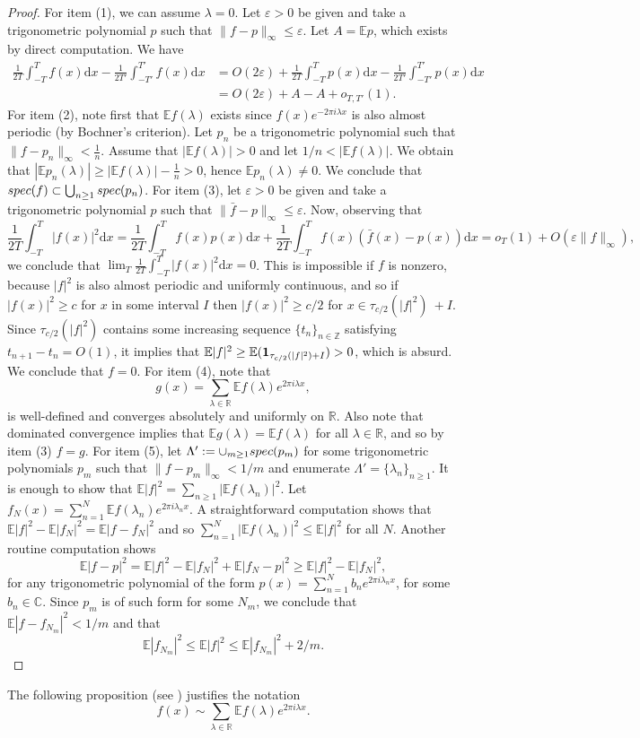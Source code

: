 \documentclass[a4paper,reqno,12pt]{amsart}
\newcommand{\E}{\mathcal{E}}
\newcommand{\z}{\mathbb{Z}}
\renewcommand{\r}{\mathbb{R}}
\newcommand{\cp}{\mathbb{C}} %
\newcommand{\la}{\lambda}
\newcommand{\ep}{\varepsilon}
\renewcommand{\d}{\mathrm{d}}
\newcommand{\1}{{\bf 1}}
\renewcommand{\E}{\mathbb{E}}
\renewcommand{\1}{{\bo 1}}
\newcommand{\spec}{{\rm spec}}
\begin{document}
\begin{proof}
For item (1), we can assume $\la=0$. Let $\ep>0$ be given and take a trigonometric polynomial $p$ such that $\|f-p\|_\infty\leq \ep$. Let $A=\E p$, which exists by direct computation. We have
\begin{align*}
\frac{1}{2T}\int_{-T}^T f(x)\d x - \frac{1}{2T'}\int_{-T'}^{T'} f(x)\d x & = O(2\ep) + \frac{1}{2T}\int_{-T}^T p(x)\d x - \frac{1}{2T'}\int_{-T'}^{T'} p(x)\d x \\ & = O(2\ep)  + A - A + o_{T,T'}(1).
\end{align*}
For item (2), note first that $\E f(\la)$ exists since $f(x)e^{-2\pi i \la x}$ is also almost periodic (by Bochner's criterion). Let $p_n$ be a trigonometric polynomial such that
$
\|f-p_n\|_\infty < \frac{1}{n}.
$
Assume that $|\E f(\la)|>0$ and let $1/n<|\E f(\la)|$. We obtain that
$|\E p_n(\la)| \geq |\E f(\la)|-\frac{1}{n} > 0$, hence $\E p_n(\la)\neq 0$. 
We conclude that $\spec(f) \subset \bigcup_{n\geq 1} \spec(p_n)$.
For item (3), let $\ep>0$ be given and take a trigonometric polynomial $p$ such that $\|\bar f-p\|_\infty\leq \ep$. Now, observing that
$$
\frac{1}{2T}\int_{-T}^T |f(x)|^2\d x = \frac{1}{2T}\int_{-T}^T f(x)p(x)\d x + \frac{1}{2T}\int_{-T}^T f(x)(\bar f(x)-p(x))\d x = o_T(1) + O(\ep\|f\|_\infty),
$$
we conclude that $\lim_T \frac{1}{2T}\int_{-T}^T |f(x)|^2\d x=0$. This is impossible if $f$ is nonzero, because $|f|^2$ is also almost periodic and uniformly continuous, and so if $|f(x)|^2 \geq c$ for $x$ in some interval $I$ then $|f(x)|^2 \geq c/2$ for $x\in \tau_{c/2}(|f|^2)\
 + I$. Since $\tau_{c/2}(|f|^2)$ contains some increasing sequence $\{t_n\}_{n\in \z}$ satisfying $t_{n+1}-t_n =O(1)$, it implies that $\E |f|^2 \geq \E ({\bf 1}_{\tau_{c/2}(|f|^2) + I})>0$, which is absurd. We conclude that $f=0$.
For item (4), note that 
$$
g(x)=\sum_{\la\in \r} \E f(\la)e^{2\pi i \la x},
$$
is well-defined and converges absolutely and uniformly on $\r$. Also note that dominated convergence implies that $\E g(\la)=\E f(\la)$ for all $\la\in \r$, and so by item (3) $f=g$.
For item (5), let $ \Lambda':=\cup_{m\geq 1} \spec(p_m)$ for some trigonometric polynomials $p_m$ such that $\|f-p_m\|_\infty<1/m$ and enumerate $\Lambda'=\{\la_n\}_{n\geq 1}$. It is enough to show that $\E |f|^2 = \sum_{n\geq 1} |\E f(\la_n)|^2$. Let $f_N(x) = \sum_{n=1}^N \E f(\la_n) e^{2\pi i \la_n x}$. A straightforward computation shows that $\E |f|^2 - \E |f_N|^2 = \E |f-f_N|^2$ and so $\sum_{n=1}^N |\E f(\la_n)|^2 \leq \E |f|^2$ for all $N$. Another routine computation shows
$$
\E |f-p|^2 = \E |f|^2 - \E |f_N|^2 + \E |f_N-p|^2 \geq \E |f|^2 - \E |f_N|^2,
$$
for any trigonometric polynomial of the form $p(x)=\sum_{n=1}^N b_n e^{2\pi i \la_n x}$, for some $b_n\in \cp$. Since $p_m$ is of such form for some $N_m$, we conclude that $\E |f-f_{N_m}|^2 < 1/m$ and that 
$$
\E |f_{N_m}|^2 \leq \E |f|^2 \leq \E |f_{N_m}|^2 +2/m.
$$
\end{proof}
The following proposition  (see \cite[p. 46]{Be}) justifies the notation 
$$
f(x)\sim \sum_{\la\in\r} \E f(\la) e^{2\pi i \la x}.
$$
\end{document}
